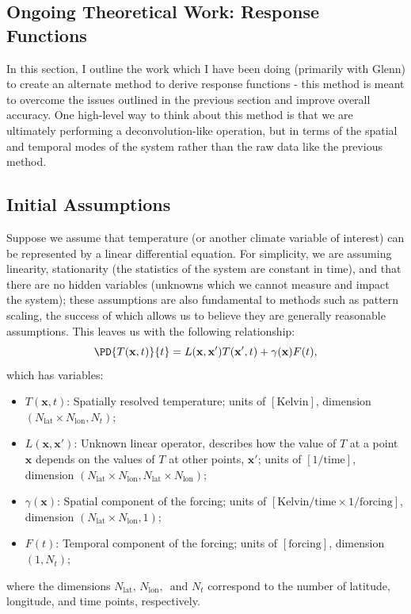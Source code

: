   \clearpage

\subsection{Ongoing Theoretical Work: Response Functions}

In this section, I outline the work which I have been doing (primarily with Glenn) to create an alternate method to derive response functions - this method is meant to overcome the issues outlined in the previous section and improve overall accuracy. One high-level way to think about this method is that we are ultimately performing a deconvolution-like operation, but in terms of the spatial and temporal modes of the system rather than the raw data like the previous method.

\subsection*{Initial Assumptions}

Suppose we assume that temperature (or another climate variable of interest) can be represented by a linear differential equation. For simplicity, we are assuming linearity, stationarity (the statistics of the system are constant in time), and that there are no hidden variables (unknowns which we cannot measure and impact the system); these assumptions are also fundamental to methods such as pattern scaling, the success of which allows us to believe they are generally reasonable assumptions. This leaves us with the following relationship:
\begin{equation}\label{eq:lindiff}
  \PD{T(\mathbf{x},t)}{t} = L(\mathbf{x},\mathbf{x}')T(\mathbf{x}',t) + \gamma(\mathbf{x})F(t),
\end{equation}
which has variables:
\begin{itemize}
  \item $T(\mathbf{x},t)$: Spatially resolved temperature; units of $\left[\text{Kelvin}\right]$, dimension $(N_{\text{lat}} \times N_{\text{lon}}, N_t)$;
  \item $L(\mathbf{x},\mathbf{x}')$: Unknown linear operator, describes how the value of $T$ at a point $\mathbf{x}$ depends on the values of $T$ at other points, $\mathbf{x}'$; units of $\left[1/\text{time}\right]$, dimension $(N_{\text{lat}} \times N_{\text{lon}}, N_{\text{lat}} \times N_{\text{lon}})$;
  \item $\gamma(\mathbf{x})$: Spatial component of the forcing; units of $\left[\text{Kelvin}/\text{time} \times 1/\text{forcing}\right]$, dimension $(N_{\text{lat}} \times N_{\text{lon}}, 1)$;
  \item $F(t)$: Temporal component of the forcing; units of $\left[\text{forcing}\right]$, dimension $(1, N_t)$;
\end{itemize}
where the dimensions $N_{\text{lat}}, \, N_{\text{lon}}, \, \text{ and } N_t$ correspond to the number of latitude, longitude, and time points, respectively.

